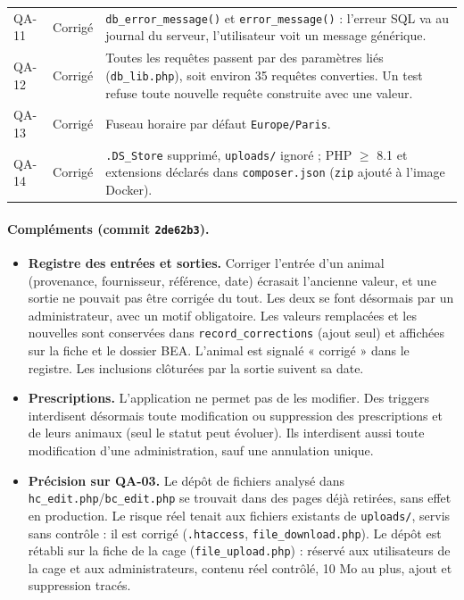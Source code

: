 \documentclass[11pt,a4paper]{article}
\newcommand{\f}[1]{\nolinkurl{#1}}
\begin{document}
\begin{center}
\begin{tabularx}{\textwidth}{@{}lp{2.1cm}X@{}}
QA-11 & \textcolor{ok}{Corrigé} & \f{db_error_message()} et \f{error_message()} : l'erreur SQL va au journal du serveur, l'utilisateur voit un message générique.\\
QA-12 & \textcolor{ok}{Corrigé} & Toutes les requêtes passent par des paramètres liés (\f{db_lib.php}), soit environ 35 requêtes converties. Un test refuse toute nouvelle requête construite avec une valeur.\\
QA-13 & \textcolor{ok}{Corrigé} & Fuseau horaire par défaut \f{Europe/Paris}.\\
QA-14 & \textcolor{ok}{Corrigé} & \f{.DS_Store} supprimé, \f{uploads/} ignoré ; PHP $\geq$ 8.1 et extensions déclarés dans \f{composer.json} (\texttt{zip} ajouté à l'image Docker).\\
\bottomrule
\end{tabularx}
\end{center}

\paragraph{Compléments (commit \f{2de62b3}).}
\begin{itemize}[nosep]
  \item \textbf{Registre des entrées et sorties.} Corriger l'entrée d'un
    animal (provenance, fournisseur, référence, date) écrasait l'ancienne
    valeur, et une sortie ne pouvait pas être corrigée du tout. Les deux se
    font désormais par un administrateur, avec un motif obligatoire. Les
    valeurs remplacées et les nouvelles sont conservées dans
    \f{record_corrections} (ajout seul) et affichées sur la fiche et le dossier
    BEA. L'animal est signalé « corrigé » dans le registre. Les inclusions
    clôturées par la sortie suivent sa date.
  \item \textbf{Prescriptions.} L'application ne permet pas de les modifier.
    Des triggers interdisent désormais toute modification ou suppression des
    prescriptions et de leurs animaux (seul le statut peut évoluer). Ils
    interdisent aussi toute modification d'une administration, sauf une
    annulation unique.
  \item \textbf{Précision sur QA-03.} Le dépôt de fichiers analysé dans
    \f{hc_edit.php}/\f{bc_edit.php} se trouvait dans des pages déjà retirées,
    sans effet en production. Le risque réel tenait aux fichiers existants de
    \f{uploads/}, servis sans contrôle : il est corrigé (\f{.htaccess},
    \f{file_download.php}). Le dépôt est rétabli sur la fiche de la cage
    (\f{file_upload.php}) : réservé aux utilisateurs de la cage et aux
    administrateurs, contenu réel contrôlé, 10 Mo au plus, ajout et
    suppression tracés.
\end{itemize}
\end{document}
